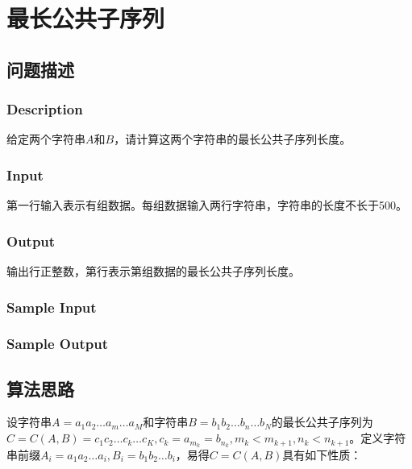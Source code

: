 \section{最长公共子序列}
\subsection{问题描述}
\subsubsection*{Description}
给定两个字符串$A$和$B$，请计算这两个字符串的最长公共子序列长度。

\subsubsection*{Input}

第一行输入表示有组数据。每组数据输入两行字符串，字符串的长度不长于500。

\subsubsection*{Output}

输出行正整数，第行表示第组数据的最长公共子序列长度。

\subsubsection*{Sample Input}






\subsubsection*{Sample Output}



\subsection{算法思路}

设字符串$A=a_1a_2\dots a_m\dots a_M$和字符串$B=b_1b_2\dots b_n\dots b_N$的最长公共子序列为$C=C(A,B)=c_1c_2\dots c_k\dots c_K,c_k=a_{m_k}=b_{n_k},m_k<m_{k+1},n_k<n_{k+1}$。定义字符串前缀$A_i=a_1a_2\dots a_i,B_i=b_1b_2\dots b_i$，易得$C=C(A,B)$具有如下性质：

